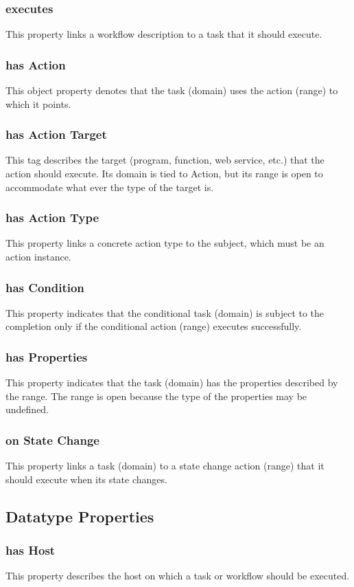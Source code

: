 			\subsubsection{
			executes
			}
			This property links a workflow description to a task that it should execute.
			\subsubsection{
			has Action
			}
			This object property denotes that the task (domain) uses the action (range) to which it points.
			\subsubsection{
			has Action Target
			}
			This tag describes the target (program, function, web service, etc.) that the action should execute. Its domain is tied to Action, but its range is open to accommodate what ever the type of the target is.
			\subsubsection{
			has Action Type
			}
			This property links a concrete action type to the subject, which must be an action instance.
			\subsubsection{
			has Condition
			}
			This property indicates that the conditional task (domain) is subject to the completion only if the conditional action (range) executes successfully.
			\subsubsection{
			has Properties
			}
			This property indicates that the task (domain) has the properties described by the range. The range is open because the type of the properties may be undefined.
			\subsubsection{
			on State Change
			}
			This property links a task (domain) to a state change action (range) that it should execute when its state changes.
\subsection{Datatype Properties}
			\subsubsection{
			has Host
			}
			This property describes the host on which a task or workflow should be executed.
